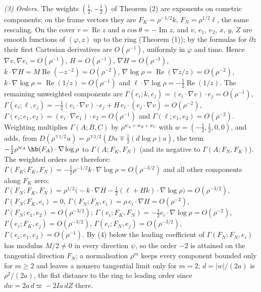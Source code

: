 \emph{(3) Orders.} The weights $(\tfrac12, -\tfrac12)$ of Theorem (2) are exponents on cometric components; on the frame vectors they are $F_K = \rho^{-1/2}k$, $F_N = \rho^{1/2}\ell$, the same rescaling. On the cover $r = \operatorname{Re} z$ and $a\cos\theta = -\operatorname{Im} z$, and $v$, $e_1$, $e_2$, $x$, $y$, $Z$ are smooth functions of $(\varphi, z)$ up to the ring (Theorem (1)); by the formulas for $\partial z$ their first Cartesian derivatives are $O(\rho^{-1})$, uniformly in $\varphi$ and time. Hence $\nabla v, \nabla e_i = O(\rho^{-1})$, $H = O(\rho^{-1})$, $\nabla H = O(\rho^{-3})$, $k \cdot \nabla H = M\operatorname{Re}(-z^{-2}) = O(\rho^{-2})$, $\nabla\log\rho = \operatorname{Re}(\nabla z/z) = O(\rho^{-2})$, $k \cdot \nabla\log\rho = \operatorname{Re}(1/z) = O(\rho^{-1})$ and $\ell \cdot \nabla\log\rho = -\tfrac12\operatorname{Re}(1/z)$. The remaining unweighted components are $\Gamma(e_i; k, e_j) = (e_i \cdot \nabla v) \cdot e_j = O(\rho^{-1})$, $\Gamma(e_i; \ell, e_j) = -\tfrac12(e_i \cdot \nabla v) \cdot e_j + H\,e_i \cdot (e_j \cdot \nabla v) = O(\rho^{-2})$, $\Gamma(e_i; e_1, e_2) = (e_i \cdot \nabla e_1) \cdot e_2 = O(\rho^{-1})$ and $\Gamma(\ell; e_1, e_2) = O(\rho^{-2})$. Weighting multiplies $\Gamma(A; B, C)$ by $\rho^{w_A + w_B + w_C}$ with $w = (-\tfrac12, \tfrac12, 0, 0)$, and adds, from $D(\rho^{\mp 1/2}u) = \rho^{\mp1/2}(Du \mp \tfrac12 (d\log\rho) u)$, the term $-\tfrac12\rho^{w_A}\,\hb(F_A) \cdot \nabla\log\rho$ to $\Gamma(A; F_K, F_N)$ (and its negative to $\Gamma(A; F_N, F_K)$). The weighted orders are therefore: $\Gamma(F_K; F_K, F_N) = -\tfrac12\rho^{-1/2}k \cdot \nabla\log\rho = O(\rho^{-3/2})$ and all other components along $F_K$ zero; $\Gamma(F_N; F_K, F_N) = \rho^{1/2}\bigl(-k \cdot \nabla H - \tfrac12(\ell + Hk) \cdot \nabla\log\rho\bigr) = O(\rho^{-3/2})$, $\Gamma(F_N; F_K, e_i) = 0$, $\Gamma(F_N; F_N, e_i) = \rho\,e_i \cdot \nabla H = O(\rho^{-2})$, $\Gamma(F_N; e_1, e_2) = O(\rho^{-3/2})$; $\Gamma(e_i; F_K, F_N) = -\tfrac12 e_i \cdot \nabla\log\rho = O(\rho^{-2})$, $\Gamma(e_i; F_K, e_j) = O(\rho^{-3/2})$, $\Gamma(e_i; F_N, e_j) = O(\rho^{-3/2})$, $\Gamma(e_i; e_1, e_2) = O(\rho^{-1})$. By (4) below the leading coefficient of $\Gamma(F_N; F_N, e_i)$ has modulus $M/2 \neq 0$ in every direction $\psi$, so the order $-2$ is attained on the tangential direction $F_N$; a normalisation $\rho^m$ keeps every component bounded only for $m \geq 2$ and leaves a nonzero tangential limit only for $m = 2$; $d = |w|/(2a)$ is $\rho^2/(2a)$, the flat distance to the ring to leading order since $dw = 2a\,d\varpi - 2Ia\,dZ$ there.

